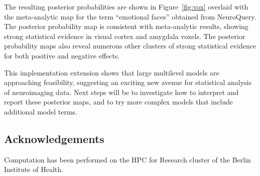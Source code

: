 \documentclass[../main.tex]{subfiles}
\begin{document}
The resulting posterior probabilities are shown in Figure~\ref{fig:vox} overlaid with the meta-analytic map for the term ``emotional faces'' obtained from NeuroQuery\cite{dockes_neuroquery_2020}. The posterior probability map is consistent with meta-analytic results, showing strong statistical evidence in visual cortex and amygdala voxels. The posterior probability maps also reveal numerous other clusters of strong statistical evidence for both positive and negative effects. 

This implementation extension shows that large multilevel models are approaching feasibility, suggesting an exciting new avenue for statistical analysis of neuroimaging data. Next steps will be to investigate how to interpret and report these posterior maps, and to try more complex models that include additional model terms.

\subsection*{Acknowledgements}

Computation has been performed on the HPC for Research cluster of the Berlin Institute of Health.

\printbibliography
\end{document}
